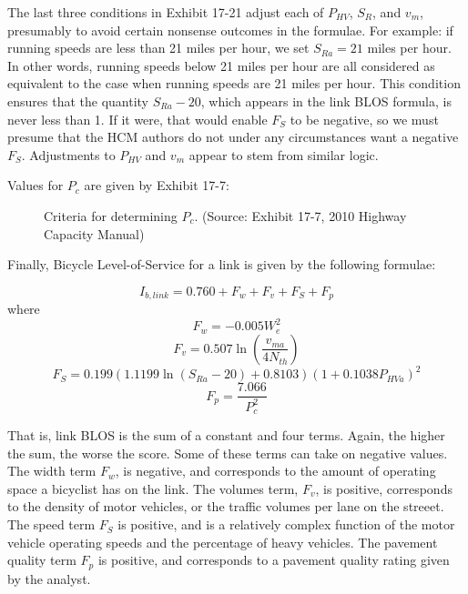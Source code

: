 \documentclass[11pt]{article} %
\begin{document}
The last three conditions in Exhibit 17-21 adjust each of $P_{HV}$, $S_R$, and $v_m$, presumably to avoid certain nonsense outcomes in the formulae. For example: if running speeds are less than 21 miles per hour, we set $S_{Ra} = 21$ miles per hour. In other words, running speeds below 21 miles per hour are all considered as equivalent to the case when running speeds are 21 miles per hour. This condition ensures that the quantity $S_{Ra}-20$, which appears in the link BLOS formula, is never less than 1. If it were, that would enable $F_S$ to be negative, so we must presume that the HCM authors do not under any circumstances want a negative $F_S$. Adjustments to $P_{HV}$ and $v_m$ appear to stem from similar logic.

Values for $P_c$ are given by Exhibit 17-7:

\vspace{12pt}

\begin{figure}[h]
\centering
{}

\caption{Criteria for determining $P_c$. (Source: Exhibit 17-7, 2010 Highway Capacity Manual)}

\label{fig:HCM_ex17-7}

\end{figure}

\vspace{12pt}

Finally, Bicycle Level-of-Service for a link is given by the following formulae:

$$I_{b,link} = 0.760 + F_w + F_v + F_S + F_p$$
where
$$F_w = -0.005 W_e^2$$
$$F_v = 0.507 \ln \left( \frac{v_{ma}}{4 N_{th}} \right)$$
$$F_S = 0.199 \left(1.1199 \ln (S_{Ra}-20) +0.8103 \right) (1+0.1038P_{HVa})^2$$
$$F_p = \frac{7.066}{P_c^2}$$

That is, link BLOS is the sum of a constant and four terms. Again, the higher the sum, the worse the score. Some of these terms can take on negative values. The width term $F_w$, is negative, and corresponds to the amount of operating space a bicyclist has on the link. The volumes term, $F_v$, is positive, corresponds to the density of motor vehicles, or the traffic volumes per lane on the streeet. The speed term $F_S$ is positive, and is a relatively complex function of the motor vehicle operating speeds and the percentage of heavy vehicles. The pavement quality term $F_p$ is positive, and corresponds to a pavement quality rating given by the analyst.
\end{document}
